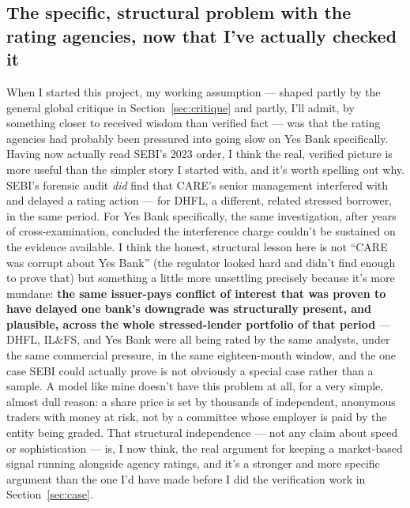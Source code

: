 \subsection{The specific, structural problem with the rating agencies, now that I've actually checked it}
When I started this project, my working assumption — shaped partly by the general global critique in Section~\ref{sec:critique} and partly, I'll admit, by something closer to received wisdom than verified fact — was that the rating agencies had probably been pressured into going slow on Yes Bank specifically. Having now actually read SEBI's 2023 order, I think the real, verified picture is more useful than the simpler story I started with, and it's worth spelling out why. SEBI's forensic audit \emph{did} find that CARE's senior management interfered with and delayed a rating action — for DHFL, a different, related stressed borrower, in the same period. For Yes Bank specifically, the same investigation, after years of cross-examination, concluded the interference charge couldn't be sustained on the evidence available. I think the honest, structural lesson here is not ``CARE was corrupt about Yes Bank'' (the regulator looked hard and didn't find enough to prove that) but something a little more unsettling precisely because it's more mundane: \textbf{the same issuer-pays conflict of interest that was proven to have delayed one bank's downgrade was structurally present, and plausible, across the whole stressed-lender portfolio of that period} — DHFL, IL\&FS, and Yes Bank were all being rated by the same analysts, under the same commercial pressure, in the same eighteen-month window, and the one case SEBI could actually prove is not obviously a special case rather than a sample. A model like mine doesn't have this problem at all, for a very simple, almost dull reason: a share price is set by thousands of independent, anonymous traders with money at risk, not by a committee whose employer is paid by the entity being graded. That structural independence — not any claim about speed or sophistication — is, I now think, the real argument for keeping a market-based signal running alongside agency ratings, and it's a stronger and more specific argument than the one I'd have made before I did the verification work in Section~\ref{sec:case}.

